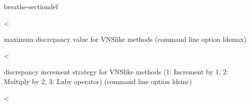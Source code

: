\documentclass[letterpaper,10pt,openany,oneside,english]{sphinxmanual}
\begin{document}
\begin{fulllineitems}
\begin{sphinxuseclass}{breathe-sectiondef}
\begin{fulllineitems}
\label{\detokenize{ref/ref_cpp:_CPPv4N8ToulBar29vnsLDSincE}}\label{\detokenize{ref/ref_cpp:_CPPv3N8ToulBar29vnsLDSincE}}\label{\detokenize{ref/ref_cpp:_CPPv2N8ToulBar29vnsLDSincE}}\label{\detokenize{ref/ref_cpp:ToulBar2::vnsLDSinc__VNSInc}}
\pysigstartsignatures
\pysigstartmultiline
{}
\pysigstopmultiline
\pysigstopsignatures
\sphinxAtStartPar
\textless{} 

\sphinxAtStartPar
maximum discrepancy value for VNS\sphinxhyphen{}like methods (command line option \sphinxhyphen{}ldsmax) 

\end{fulllineitems}


\begin{fulllineitems}
\label{\detokenize{ref/ref_cpp:_CPPv4N8ToulBar27vnsKminE}}\label{\detokenize{ref/ref_cpp:_CPPv3N8ToulBar27vnsKminE}}\label{\detokenize{ref/ref_cpp:_CPPv2N8ToulBar27vnsKminE}}\label{\detokenize{ref/ref_cpp:ToulBar2::vnsKmin__i}}
\pysigstartsignatures
\pysigstartmultiline
{}
\pysigstopmultiline
\pysigstopsignatures
\sphinxAtStartPar
\textless{} 

\sphinxAtStartPar
discrepancy increment strategy for VNS\sphinxhyphen{}like methods (1: Increment by 1, 2: Multiply by 2, 3: Luby operator) (command line option \sphinxhyphen{}ldsinc) 

\end{fulllineitems}


\begin{fulllineitems}
\label{\detokenize{ref/ref_cpp:_CPPv4N8ToulBar27vnsKmaxE}}\label{\detokenize{ref/ref_cpp:_CPPv3N8ToulBar27vnsKmaxE}}\label{\detokenize{ref/ref_cpp:_CPPv2N8ToulBar27vnsKmaxE}}\label{\detokenize{ref/ref_cpp:ToulBar2::vnsKmax__i}}
\pysigstartsignatures
\pysigstartmultiline
{}
\pysigstopmultiline
\pysigstopsignatures
\sphinxAtStartPar
\textless{} 


\end{fulllineitems}
\end{sphinxuseclass}
\end{fulllineitems}
\end{document}
